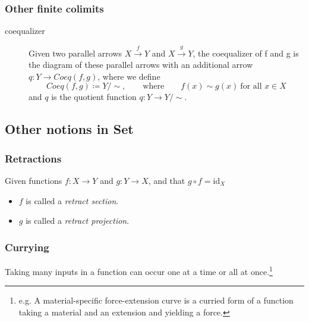 \documentclass{article}
\begin{document}
\subsubsection{Other finite colimits}
\begin{description}
\item[coequalizer] Given two parallel arrows $X \stackrel{f}\rightarrow Y$ and $X \stackrel{g}\rightarrow Y$, the coequalizer of f and g is the diagram of these parallel arrows with an additional arrow $q: Y \rightarrow Coeq(f,g)$, where we define
\begin{equation}
Coeq(f,g) \coloneqq Y/\sim, \qquad \text{where} \qquad f(x) \sim g(x)\ \text{for all } x\in X
\end{equation}
and $q$ is the quotient function $q: Y \rightarrow Y/\sim$.
\end{description}


\subsection{Other notions in Set}
\subsubsection{Retractions}
Given functions $f: X \rightarrow Y$ and $g: Y \rightarrow X$, and that $g\circ f = \text{id}_X$
\begin{itemize}
\item $f$ is called a \emph{retract section}.
\item $g$ is called a \emph{retract projection}.
\end{itemize}

\subsubsection{Currying}
Taking many inputs in a function can occur one at a time or all at once.\footnote{e.g. A material-specific force-extension curve is a curried form of a function taking a material and an extension and yielding a force.}
\end{document}
